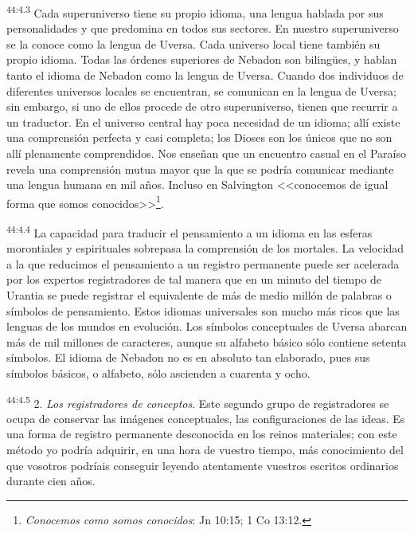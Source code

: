 \par
\textsuperscript{44:4.3} Cada superuniverso tiene su propio idioma, una lengua hablada por sus personalidades y que predomina en todos sus sectores. En nuestro superuniverso se la conoce como la lengua de Uversa. Cada universo local tiene también su propio idioma. Todas las órdenes superiores de Nebadon son biling\"ues, y hablan tanto el idioma de Nebadon como la lengua de Uversa. Cuando dos individuos de diferentes universos locales se encuentran, se comunican en la lengua de Uversa; sin embargo, si uno de ellos procede de otro superuniverso, tienen que recurrir a un traductor. En el universo central hay poca necesidad de un idioma; allí existe una comprensión perfecta y casi completa; los Dioses son los únicos que no son allí plenamente comprendidos. Nos enseñan que un encuentro casual en el Paraíso revela una comprensión mutua mayor que la que se podría comunicar mediante una lengua humana en mil años. Incluso en Salvington <<conocemos de igual forma que somos conocidos>>\footnote{\textit{Conocemos como somos conocidos}: Jn 10:15; 1 Co 13:12.}.

\par
\textsuperscript{44:4.4} La capacidad para traducir el pensamiento a un idioma en las esferas morontiales y espirituales sobrepasa la comprensión de los mortales. La velocidad a la que reducimos el pensamiento a un registro permanente puede ser acelerada por los expertos registradores de tal manera que en un minuto del tiempo de Urantia se puede registrar el equivalente de más de medio millón de palabras o símbolos de pensamiento. Estos idiomas universales son mucho más ricos que las lenguas de los mundos en evolución. Los símbolos conceptuales de Uversa abarcan más de mil millones de caracteres, aunque su alfabeto básico sólo contiene setenta símbolos. El idioma de Nebadon no es en absoluto tan elaborado, pues sus símbolos básicos, o alfabeto, sólo ascienden a cuarenta y ocho.

\par
\textsuperscript{44:4.5} 2. \textit{Los registradores de conceptos}. Este segundo grupo de registradores se ocupa de conservar las imágenes conceptuales, las configuraciones de las ideas. Es una forma de registro permanente desconocida en los reinos materiales; con este método yo podría adquirir, en una hora de vuestro tiempo, más conocimiento del que vosotros podríais conseguir leyendo atentamente vuestros escritos ordinarios durante cien años.

